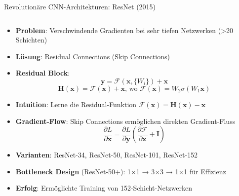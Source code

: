 \documentclass[aspectratio=1610, xcolor=dvipsnames, 9pt]{beamer}
\begin{document}
      \begin{frame}{Revolutionäre CNN-Architekturen: ResNet (2015)}
        \begin{columns}
          \begin{column}{1\textwidth}
            \begin{itemize}
              \item \textbf{Problem}: Verschwindende Gradienten bei sehr tiefen Netzwerken (>20 Schichten)
              \item \textbf{Lösung}: Residual Connections (Skip Connections)
              \item \textbf{Residual Block}:
              \begin{equation}
                \mathbf{y} = \mathcal{F}(\mathbf{x}, \{W_i\}) + \mathbf{x}
              \end{equation}
              \begin{equation}
                \mathbf{H}(\mathbf{x}) = \mathcal{F}(\mathbf{x}) + \mathbf{x} \text{, wo } \mathcal{F}(\mathbf{x}) = W_2 \sigma(W_1 \mathbf{x})
              \end{equation}
              \item \textbf{Intuition}: Lerne die Residual-Funktion $\mathcal{F}(\mathbf{x}) = \mathbf{H}(\mathbf{x}) - \mathbf{x}$
              \item \textbf{Gradient-Flow}: Skip Connections ermöglichen direkten Gradient-Fluss
              \begin{equation}
                \frac{\partial L}{\partial \mathbf{x}} = \frac{\partial L}{\partial \mathbf{y}} \left( \frac{\partial \mathcal{F}}{\partial \mathbf{x}} + \mathbf{I} \right)
              \end{equation}
              \item \textbf{Varianten}: ResNet-34, ResNet-50, ResNet-101, ResNet-152
              \item \textbf{Bottleneck Design} (ResNet-50+): 1×1 → 3×3 → 1×1 für Effizienz
              \item \textbf{Erfolg}: Ermöglichte Training von 152-Schicht-Netzwerken
            \end{itemize}
          \end{column}
        \end{columns}
      \end{frame}
\end{document}
